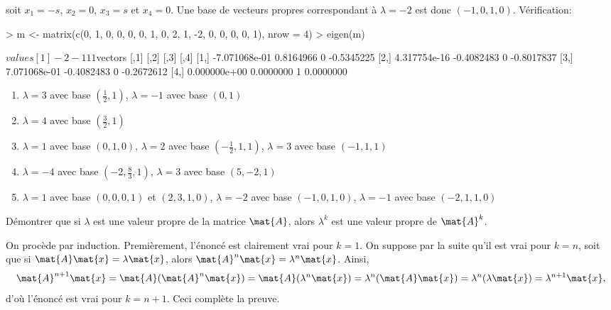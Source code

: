 \begin{exercice}
\begin{sol}
\begin{enumerate}
\begin{displaymath}
      \end{displaymath}
      soit $x_1 = -s$, $x_2 = 0$, $x_3 = s$ et $x_4 = 0$. Une base de
      vecteurs propres correspondant à $\lambda = -2$ est donc $(-1,
      0, 1, 0)$.  Vérification:
\begin{Schunk}
\begin{Sinput}
> m <- matrix(c(0, 1, 0, 0, 0, 0, 1, 0, 2, 1, -2, 0, 0, 0, 0, 1), nrow = 4)
> eigen(m)
\end{Sinput}
\begin{Soutput}
$values
[1] -2 -1  1  1

$vectors
              [,1]       [,2] [,3]       [,4]
[1,] -7.071068e-01  0.8164966    0 -0.5345225
[2,]  4.317754e-16 -0.4082483    0 -0.8017837
[3,]  7.071068e-01 -0.4082483    0 -0.2672612
[4,]  0.000000e+00  0.0000000    1  0.0000000
\end{Soutput}
\end{Schunk}
    \end{enumerate}
  \end{sol}
  \begin{rep}
    \begin{enumerate}
    \item $\lambda =  3$ avec base $(\frac{1}{2}, 1)$,
          $\lambda = -1$ avec base $(0, 1)$
    \item $\lambda =  4$ avec base $(\frac{3}{2}, 1)$
    \item $\lambda =  1$ avec base $(0, 1, 0)$,
          $\lambda =  2$ avec base $(-\frac{1}{2}, 1, 1)$,
          $\lambda =  3$ avec base $(-1, 1, 1)$
    \item $\lambda = -4$ avec base $(-2, \frac{8}{3}, 1)$,
          $\lambda =  3$ avec base $(5, -2, 1)$
    \item $\lambda =  1$ avec base $(0, 0, 0, 1)$ et $(2, 3, 1, 0)$,
          $\lambda = -2$ avec base $(-1, 0, 1, 0)$,
          $\lambda = -1$ avec base $(-2, 1, 1, 0)$
    \end{enumerate}
  \end{rep}
\end{exercice}

\begin{exercice}
  \label{ex:valeurspropres:puissance}
  Démontrer que si $\lambda$ est une valeur propre de la matrice
  $\mat{A}$, alors $\lambda^k$ est une valeur propre de $\mat{A}^k$.
  \begin{sol}
    On procède par induction. Premièrement, l'énoncé est clairement
    vrai pour $k = 1$. On suppose par la suite qu'il est vrai pour $k
    = n$, soit que si $\mat{A} \mat{x} = \lambda \mat{x}$, alors
    $\mat{A}^n \mat{x} = \lambda^n \mat{x}$. Ainsi,
    \begin{displaymath}
      \mat{A}^{n + 1} \mat{x} =
      \mat{A}(\mat{A}^n \mat{x}) =
      \mat{A}(\lambda^n \mat{x}) =
      \lambda^n (\mat{A} \mat{x}) =
      \lambda^n (\lambda \mat{x}) =
      \lambda^{n + 1} \mat{x},
    \end{displaymath}
    d'où l'énoncé est vrai pour $k = n + 1$. Ceci complète la preuve.
  \end{sol}
\end{exercice}

